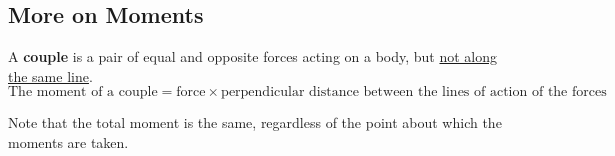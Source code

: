 \subsection{More on Moments}

A \textbf{couple} is a pair of equal and opposite forces acting on a body, but \underline{not along the same line}.
$$\text{The moment of a couple}=\text{force}\times\text{perpendicular distance between the lines of action of the forces}$$

Note that the total moment is the same, regardless of the point about which the moments are taken.
